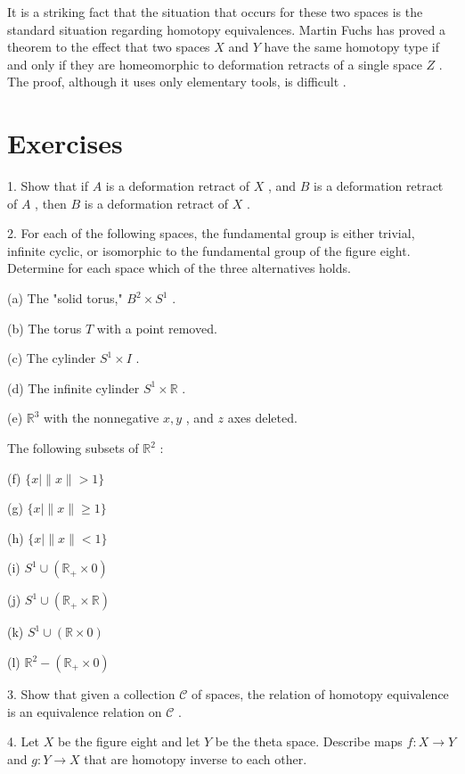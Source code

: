 It is a striking fact that the situation that occurs for these two spaces is the standard situation regarding homotopy equivalences. Martin Fuchs has proved a theorem to the effect that two spaces \(X\) and \(Y\) have the same homotopy type if and only if they are homeomorphic to deformation retracts of a single space \(Z\) . The proof, although it uses only elementary tools, is difficult 		\cite{Fuchs1971}.

\section*{Exercises}

1. Show that if \(A\) is a deformation retract of \(X\) , and \(B\) is a deformation retract of \(A\) , then \(B\) is a deformation retract of \(X\) .

2. For each of the following spaces, the fundamental group is either trivial, infinite cyclic, or isomorphic to the fundamental group of the figure eight. Determine for each space which of the three alternatives holds.

(a) The "solid torus," \({B}^{2} \times  {S}^{1}\) .

(b) The torus \(T\) with a point removed.

(c) The cylinder \({S}^{1} \times  I\) .

(d) The infinite cylinder \({S}^{1} \times  \mathbb{R}\) .

(e) \({\mathbb{R}}^{3}\) with the nonnegative \(x,y\) , and \(z\) axes deleted.

The following subsets of \({\mathbb{R}}^{2}\) :

(f) \(\{ x \mid  \parallel x\parallel  > 1\}\)

(g) \(\{ x \mid  \parallel x\parallel  \geq  1\}\)

(h) \(\{ x \mid  \parallel x\parallel  < 1\}\)

(i) \({S}^{1} \cup  \left( {{\mathbb{R}}_{ + } \times  0}\right)\)

(j) \({S}^{1} \cup  \left( {{\mathbb{R}}_{ + } \times  \mathbb{R}}\right)\)

(k) \({S}^{1} \cup  \left( {\mathbb{R} \times  0}\right)\)

(l) \({\mathbb{R}}^{2} - \left( {{\mathbb{R}}_{ + } \times  0}\right)\)

3. Show that given a collection \(\mathcal{C}\) of spaces, the relation of homotopy equivalence is an equivalence relation on \(\mathcal{C}\) .

4. Let \(X\) be the figure eight and let \(Y\) be the theta space. Describe maps \(f : X \rightarrow  Y\) and \(g : Y \rightarrow  X\) that are homotopy inverse to each other.

